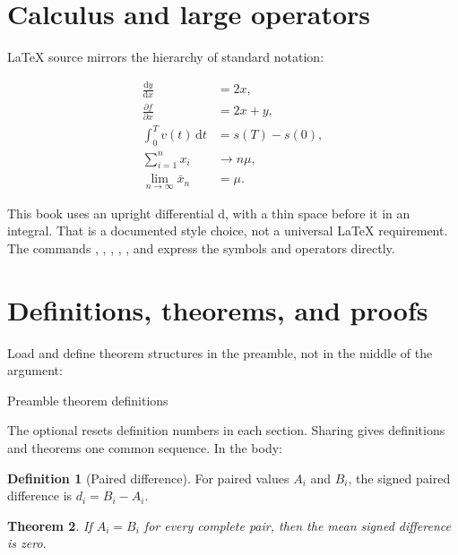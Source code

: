 \section{Calculus and large operators}

\LaTeX{} source mirrors the hierarchy of standard notation:

\begin{align*}
  \frac{\mathrm{d}y}{\mathrm{d}x} &= 2x, \\
  \frac{\partial f}{\partial x} &= 2x+y, \\
  \int_{0}^{T} v(t)\,\mathrm{d}t &= s(T)-s(0), \\
  \sum_{i=1}^{n}x_i &\longrightarrow n\mu, \\
  \lim_{n\to\infty}\bar{x}_n &= \mu.
\end{align*}

This book uses an upright differential \(\mathrm{d}\), with a thin space
\code{\textbackslash,} before it in an integral. That is a documented style
choice, not a universal \LaTeX{} requirement. The commands ,
, , , , and  express the
symbols and operators directly.

\section{Definitions, theorems, and proofs}

Load  and define theorem structures in the preamble, not in the
middle of the argument:

\begin{latexcode}{Preamble theorem definitions}
\usepackage{amsthm}

\theoremstyle{definition}
\newtheorem{definition}{Definition}[section]
\theoremstyle{plain}
\newtheorem{theorem}[definition]{Theorem}
\end{latexcode}

The optional \code{[section]} resets definition numbers in each section.
Sharing \code{[definition]} gives definitions and theorems one common sequence.
In the body:

\begin{definition}[Paired difference]
For paired values \(A_i\) and \(B_i\), the signed paired difference is
\(d_i=B_i-A_i\).
\end{definition}

\begin{theorem}
If \(A_i=B_i\) for every complete pair, then the mean signed difference is
zero.
\end{theorem}

